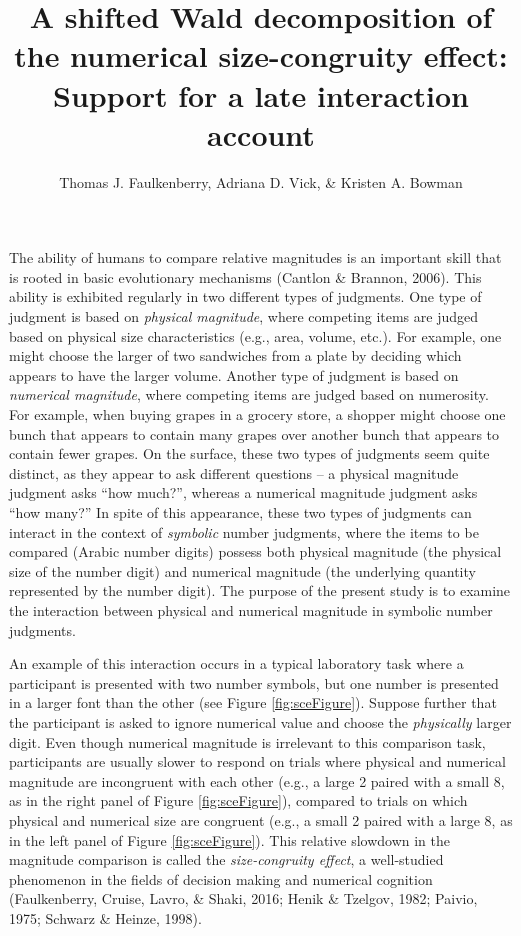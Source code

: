 \documentclass[english,man]{apa6}
\title{A shifted Wald decomposition of the numerical size-congruity effect:
Support for a late interaction account}
\author{Thomas J. Faulkenberry, Adriana D. Vick, \& Kristen A. Bowman}
\affiliation{
    \vspace{0.5cm}
          \textsuperscript{} Tarleton State University  }
\theoremstyle{definition}
\theoremstyle{definition}
\theoremstyle{definition}
\theoremstyle{remark}
\begin{document}
\maketitle

\setcounter{secnumdepth}{0}



The ability of humans to compare relative magnitudes is an important
skill that is rooted in basic evolutionary mechanisms (Cantlon \&
Brannon, 2006). This ability is exhibited regularly in two different
types of judgments. One type of judgment is based on \emph{physical
magnitude}, where competing items are judged based on physical size
characteristics (e.g., area, volume, etc.). For example, one might
choose the larger of two sandwiches from a plate by deciding which
appears to have the larger volume. Another type of judgment is based on
\emph{numerical magnitude}, where competing items are judged based on
numerosity. For example, when buying grapes in a grocery store, a
shopper might choose one bunch that appears to contain many grapes over
another bunch that appears to contain fewer grapes. On the surface,
these two types of judgments seem quite distinct, as they appear to ask
different questions -- a physical magnitude judgment asks \enquote{how
much?}, whereas a numerical magnitude judgment asks \enquote{how many?}
In spite of this appearance, these two types of judgments can interact
in the context of \emph{symbolic} number judgments, where the items to
be compared (Arabic number digits) possess both physical magnitude (the
physical size of the number digit) and numerical magnitude (the
underlying quantity represented by the number digit). The purpose of the
present study is to examine the interaction between physical and
numerical magnitude in symbolic number judgments.

An example of this interaction occurs in a typical laboratory task where
a participant is presented with two number symbols, but one number is
presented in a larger font than the other (see Figure
\ref{fig:sceFigure}). Suppose further that the participant is asked to
ignore numerical value and choose the \emph{physically} larger digit.
Even though numerical magnitude is irrelevant to this comparison task,
participants are usually slower to respond on trials where physical and
numerical magnitude are incongruent with each other (e.g., a large 2
paired with a small 8, as in the right panel of Figure
\ref{fig:sceFigure}), compared to trials on which physical and numerical
size are congruent (e.g., a small 2 paired with a large 8, as in the
left panel of Figure \ref{fig:sceFigure}). This relative slowdown in the
magnitude comparison is called the \emph{size-congruity effect}, a
well-studied phenomenon in the fields of decision making and numerical
cognition (Faulkenberry, Cruise, Lavro, \& Shaki, 2016; Henik \&
Tzelgov, 1982; Paivio, 1975; Schwarz \& Heinze, 1998).
\end{document}
